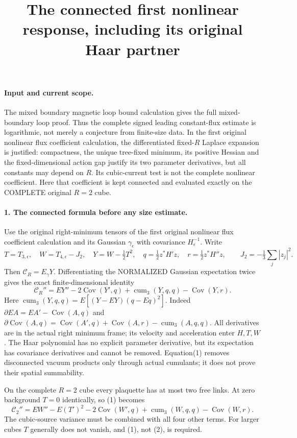 \documentclass[11pt]{article}
\title{The connected first nonlinear response, including its original Haar partner}\author{}\date{}
\begin{document}
\maketitle
\paragraph{Input and current scope.}
The mixed boundary magnetic loop bound calculation gives the full mixed-boundary loop proof.
Thus the complete signed leading constant-flux estimate is logarithmic,
not merely a conjecture from finite-size data. In the first original nonlinear flux coefficient calculation, the differentiated
fixed-$R$ Laplace expansion is justified: compactness, the unique tree-fixed
minimum, its positive Hessian and the fixed-dimensional action gap justify
its two parameter derivatives, but all constants may depend on $R$.
Its cubic-current test is not the complete nonlinear coefficient. Here
that coefficient is kept connected and evaluated exactly on the COMPLETE
original $R=2$ cube.

\paragraph{1. The connected formula before any size estimate.}
Use the original right-minimum tensors of the first original nonlinear flux coefficient calculation and its Gaussian
$\gamma_\epsilon$ with covariance $H_\epsilon^{-1}$. Write
\[
 T=T_{3,\epsilon},\quad W=T_{4,\epsilon}-J_2,\quad
 Y=W-\tfrac12 T^2,\quad
 q=\tfrac12 z^*H' z,\quad r=\tfrac12 z^*H''z,
 \qquad J_2=-\tfrac13\sum_j|z_j|^2.
\]
Then $\mathcal C_R=E_\gamma Y$. Differentiating the NORMALIZED Gaussian
expectation twice gives the exact finite-dimensional identity
\[
 \boxed{\mathcal C_R''=
 E Y''-2\operatorname{Cov}(Y',q)
       +\operatorname{cum}_3(Y,q,q)-\operatorname{Cov}(Y,r).}       \tag{1}
\]
Here
$\operatorname{cum}_3(Y,q,q)=E[(Y-EY)(q-Eq)^2]$.
Indeed $\partial E A=E A'-\operatorname{Cov}(A,q)$ and
$\partial\operatorname{Cov}(A,q)=\operatorname{Cov}(A',q)
+\operatorname{Cov}(A,r)-\operatorname{cum}_3(A,q,q)$.
All derivatives are in the actual right minimum frame; its velocity and
acceleration enter $H,T,W$. The Haar polynomial has no explicit parameter
derivative, but its expectation has covariance derivatives and cannot be
removed. Equation(1) removes disconnected vacuum products only through
actual cumulants; it does not prove their spatial summability.

On the complete $R=2$ cube every plaquette has at most two free links.
At zero background $T=0$ identically, so (1) becomes
\[
 \mathcal C_2''= E W''-E(T')^2
 -2\operatorname{Cov}(W',q)+\operatorname{cum}_3(W,q,q)
 -\operatorname{Cov}(W,r).                                        \tag{2}
\]
The cubic-source variance must be combined with all four other terms.
For larger cubes $T$ generally does not vanish, and (1), not (2), is required.
\end{document}
